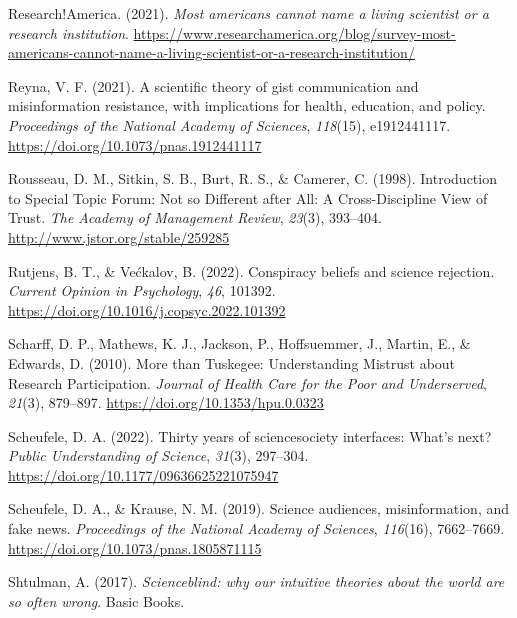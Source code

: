 \documentclass[
  jou,
  floatsintext,
  longtable,
  nolmodern,
  notxfonts,
  notimes,
  colorlinks=true,linkcolor=blue,citecolor=blue,urlcolor=blue]{apa7}
\newlength{\cslhangindent}
\newenvironment{CSLReferences}[2] %
 {\begin{list}{}{%
  \setlength{\itemindent}{0pt}
  \setlength{\leftmargin}{0pt}
  \setlength{\parsep}{0pt}
  \ifodd #1
   \setlength{\leftmargin}{\cslhangindent}
   \setlength{\itemindent}{-1\cslhangindent}
  \fi
  \setlength{\itemsep}{#2\baselineskip}}}
 {\end{list}}
\begin{document}
\begin{CSLReferences}{1}{0}
Research!America. (2021). \emph{Most americans cannot name a living
scientist or a research institution}.
\url{https://www.researchamerica.org/blog/survey-most-americans-cannot-name-a-living-scientist-or-a-research-institution/}

Reyna, V. F. (2021). A scientific theory of gist communication and
misinformation resistance, with implications for health, education, and
policy. \emph{Proceedings of the National Academy of Sciences},
\emph{118}(15), e1912441117.
\url{https://doi.org/10.1073/pnas.1912441117}

Rousseau, D. M., Sitkin, S. B., Burt, R. S., \& Camerer, C. (1998).
Introduction to Special Topic Forum: Not so Different after All: A
Cross-Discipline View of Trust. \emph{The Academy of Management Review},
\emph{23}(3), 393--404. \url{http://www.jstor.org/stable/259285}

Rutjens, B. T., \& Većkalov, B. (2022). Conspiracy beliefs and science
rejection. \emph{Current Opinion in Psychology}, \emph{46}, 101392.
\url{https://doi.org/10.1016/j.copsyc.2022.101392}

Scharff, D. P., Mathews, K. J., Jackson, P., Hoffsuemmer, J., Martin,
E., \& Edwards, D. (2010). More than Tuskegee: Understanding Mistrust
about Research Participation. \emph{Journal of Health Care for the Poor
and Underserved}, \emph{21}(3), 879--897.
\url{https://doi.org/10.1353/hpu.0.0323}

Scheufele, D. A. (2022). Thirty years of science{\textendash}society
interfaces: What{'}s next? \emph{Public Understanding of Science},
\emph{31}(3), 297--304. \url{https://doi.org/10.1177/09636625221075947}

Scheufele, D. A., \& Krause, N. M. (2019). Science audiences,
misinformation, and fake news. \emph{Proceedings of the National Academy
of Sciences}, \emph{116}(16), 7662--7669.
\url{https://doi.org/10.1073/pnas.1805871115}

Shtulman, A. (2017). \emph{Scienceblind: why our intuitive theories
about the world are so often wrong}. Basic Books.


\end{CSLReferences}
\end{document}
